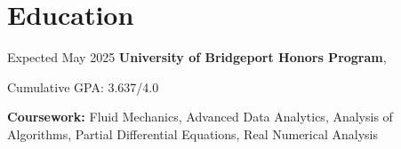 \section{Education}
    \begin{twocolentry}{
        Expected May 2025
    }
        \textbf{University of Bridgeport Honors Program}, 
    \end{twocolentry}

    \vspace{0.10 cm}
    \begin{onecolentry}
        \begin{highlights}
            \item Cumulative GPA: 3.637/4.0
            \item \textbf{Coursework:} Fluid Mechanics, Advanced Data Analytics, Analysis of Algorithms, Partial Differential Equations, Real Numerical Analysis
        \end{highlights}
    \end{onecolentry}